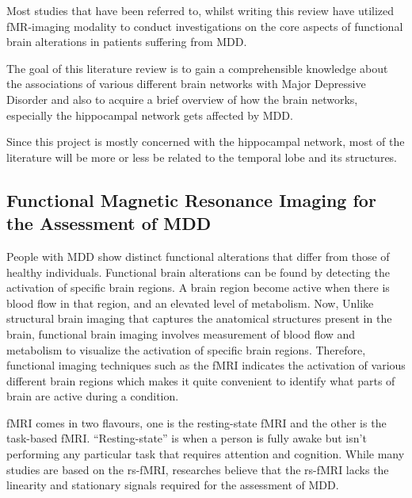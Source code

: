 \documentclass{article}
\begin{document}
Most studies that have been referred to, whilst writing this review
have utilized fMR-imaging modality to conduct investigations on the
core aspects of functional brain alterations in patients suffering
from MDD.

The goal of this literature review is to gain a comprehensible
knowledge about the associations of various different brain networks
with Major Depressive Disorder and also to acquire a brief overview of
how the brain networks, especially the hippocampal network gets
affected by MDD.

Since this project is mostly concerned with the hippocampal network,
most of the literature will be more or less be related to the temporal
lobe and its structures.



\subsection{Functional Magnetic Resonance Imaging for the Assessment
of MDD}

People with MDD show distinct functional alterations that differ from
those of healthy individuals. Functional brain alterations can be
found by detecting the activation of specific brain regions. A brain
region become active when there is blood flow in that region, and an
elevated level of metabolism. Now, Unlike structural brain imaging
that captures the anatomical structures present in the brain,
functional brain imaging involves measurement of blood flow and
metabolism to visualize the activation of specific brain regions.
Therefore, functional imaging techniques such as the fMRI indicates
the activation of various different brain regions which makes it quite
convenient to identify what parts of brain are active during a
condition.

fMRI comes in two flavours, one is the resting-state fMRI and the
other is the task-based fMRI. ``Resting-state'' is when a person is
fully awake but isn't performing any particular task that requires
attention and cognition. While many studies are based on the rs-fMRI,
researches believe that the rs-fMRI lacks the linearity and stationary
signals required for the assessment of MDD.
\end{document}
